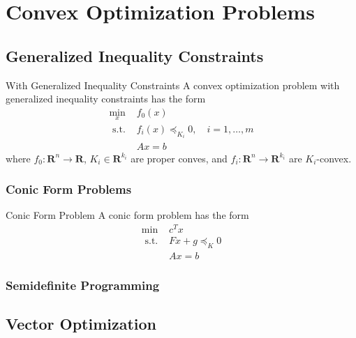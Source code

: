 \chapter{Convex Optimization Problems}

\section{Generalized Inequality Constraints}

\begin{definition}{With Generalized Inequality Constraints}{}
    A convex optimization problem with generalized inequality constraints has the form
    \begin{equation}
        \begin{array}{ll}
            \min_x        & f_{0}(x)                                    \\
            \text{ s.t. } & f_{i}(x)\preceq_{K_{i}}0,\quad i=1,\ldots,m \\
                          & Ax=b
        \end{array}
    \end{equation}
    where $f_{0}:\mathbf{R}^n\rightarrow\mathbf{R}$, $K_i\in\mathbf{R}^{k_i}$ are proper conves, and $f_i:\mathbf{R}^n\rightarrow\mathbf{R}^{k_i}$ are $K_i$-convex.
\end{definition}

\subsection{Conic Form Problems}

\begin{definition}{Conic Form Problem}{}
    A conic form problem has the form
    \begin{equation}
        \begin{array}{ll}
            \min          & c^{T}x           \\
            \text{ s.t. } & Fx+g\preceq_{K}0 \\
                          & Ax=b
        \end{array}
    \end{equation}
\end{definition}

\subsection{Semidefinite Programming}

\section{Vector Optimization}